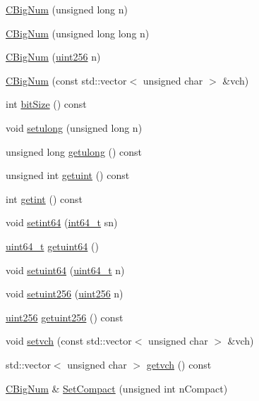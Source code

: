 \begin{DoxyCompactItemize}
\hyperlink{class_c_big_num_ab10a8c87dd0e8ca79f67df75ca7e7ecc}{C\+Big\+Num} (unsigned long n)
\item 
\hyperlink{class_c_big_num_a18865e153442cd15aec3bfc9acda8dce}{C\+Big\+Num} (unsigned long long n)
\item 
\hyperlink{class_c_big_num_a47684495c159d6279490151ae4497332}{C\+Big\+Num} (\hyperlink{classuint256}{uint256} n)
\item 
\hyperlink{class_c_big_num_ad3c2843e6755a612b8734eb6e0f03ced}{C\+Big\+Num} (const std\+::vector$<$ unsigned char $>$ \&vch)
\item 
int \hyperlink{class_c_big_num_acd423cb3d3249c8448e9c7a7f2e0d6bc}{bit\+Size} () const 
\item 
void \hyperlink{class_c_big_num_ac8c00c696d9cbd3fa309a2d0a6bc4b1d}{setulong} (unsigned long n)
\item 
unsigned long \hyperlink{class_c_big_num_a48b83ff7e74140b0b7e0a4ecee4fde78}{getulong} () const 
\item 
unsigned int \hyperlink{class_c_big_num_a52ccd774492092c2ae19f256b9eaf025}{getuint} () const 
\item 
int \hyperlink{class_c_big_num_a6cc21efc13d985c53104d48665bec019}{getint} () const 
\item 
void \hyperlink{class_c_big_num_aca73fa36a797c91b30515ae61cc5d765}{setint64} (\hyperlink{stdint_8h_adec1df1b8b51cb32b77e5b86fff46471}{int64\+\_\+t} sn)
\item 
\hyperlink{stdint_8h_aaa5d1cd013383c889537491c3cfd9aad}{uint64\+\_\+t} \hyperlink{class_c_big_num_a2cc30d131f0ef727d0ba21f964158b2b}{getuint64} ()
\item 
void \hyperlink{class_c_big_num_ae61a86bfe3b286a2cfda45ffba1c1310}{setuint64} (\hyperlink{stdint_8h_aaa5d1cd013383c889537491c3cfd9aad}{uint64\+\_\+t} n)
\item 
void \hyperlink{class_c_big_num_ade94c52f2f5d5a20e605125fcf727a34}{setuint256} (\hyperlink{classuint256}{uint256} n)
\item 
\hyperlink{classuint256}{uint256} \hyperlink{class_c_big_num_ad17ff84ee557ca5ad4b854e14d08099f}{getuint256} () const 
\item 
void \hyperlink{class_c_big_num_aa9236c14e34519e9b173a9a4b80f5621}{setvch} (const std\+::vector$<$ unsigned char $>$ \&vch)
\item 
std\+::vector$<$ unsigned char $>$ \hyperlink{class_c_big_num_aa0660ea2e5c401414f052ee14f6ea896}{getvch} () const 
\item 
\hyperlink{class_c_big_num}{C\+Big\+Num} \& \hyperlink{class_c_big_num_a27e3ca82a40ae0c34ac4c059e4d0d66c}{Set\+Compact} (unsigned int n\+Compact)

\end{DoxyCompactItemize}
